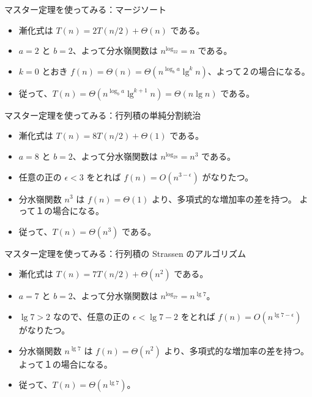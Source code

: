 \documentclass[unicode,11pt,aspectratio=169,notes]{beamer} %
\begin{document}
\begin{frame}{マスター定理を使ってみる：マージソート}
  \begin{itemize}
    \item<+-> 漸化式は $T(n)=2T(n/2)+\Theta(n)$ である。
    \item<+-> $a=2$ と $b=2$、よって分水嶺関数は $n^{\log_22}=n$ である。
    \item<+-> $k=0$ とおき $f(n)=\Theta(n)=\Theta(n^{\log_ba}\lg^kn)$、よって２の場合になる。
    \item<+-> 従って、$T(n)=\Theta(n^{\log_ba}\lg^{k+1}n)=\Theta(n\lg n)$ である。
  \end{itemize}
\end{frame}


\begin{frame}{マスター定理を使ってみる：行列積の単純分割統治}
  \begin{itemize}
    \item<+-> 漸化式は $T(n)=8T(n/2)+\Theta(1)$ である。
    \item<+-> $a=8$ と $b=2$、よって分水嶺関数は $n^{\log_28}=n^3$ である。
    \item<+-> 任意の正の $\epsilon<3$ をとれば $f(n)=O(n^{3-\epsilon})$ がなりたつ。
    \item<+-> 分水嶺関数 $n^3$ は $f(n)=\Theta(1)$ より、多項式的な増加率の差を持つ。
    よって１の場合になる。
    \item<+-> 従って、$T(n)=\Theta(n^3)$ である。
  \end{itemize}
\end{frame}


\begin{frame}{マスター定理を使ってみる：行列積の Strassen のアルゴリズム}
  \begin{itemize}
    \item<+-> 漸化式は $T(n)=7T(n/2)+\Theta(n^2)$ である。
    \item<+-> $a=7$ と $b=2$、よって分水嶺関数は $n^{\log_27}=n^{\lg 7}$。
    \item<+-> $\lg 7 > 2$ なので、任意の正の $\epsilon<\lg 7-2$ をとれば $f(n)=O(n^{\lg 7-\epsilon})$ がなりたつ。
    \item<+-> 分水嶺関数 $n^{\lg 7}$ は $f(n)=\Theta(n^2)$ より、多項式的な増加率の差を持つ。
    よって１の場合になる。
    \item<+-> 従って、$T(n)=\Theta(n^{\lg 7})$。
  \end{itemize}
\end{frame}
\end{document}
